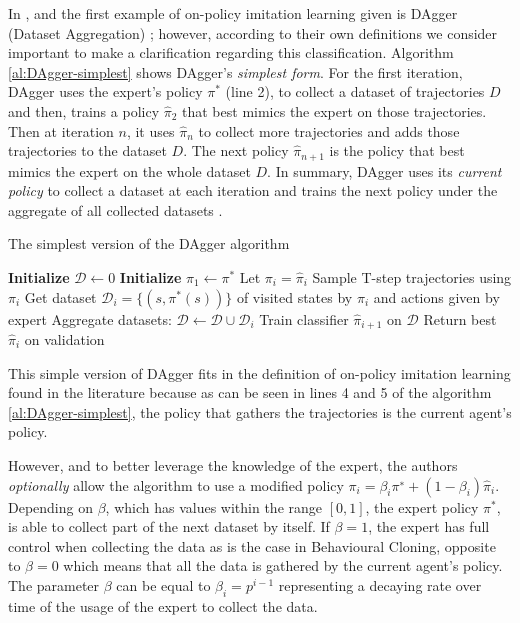In \cite{DBLP:journals/corr/LaskeyLHLMFG17}, \cite{OtherLaskeydefinitions:2019} and \cite{Osa:2018} the first example of on-policy imitation learning given is DAgger (Dataset  Aggregation) \cite{DAgger-Ross:2011}; however, according to their own definitions we consider important to make a clarification regarding this classification. Algorithm \ref{al:DAgger-simplest} shows DAgger's \textit{simplest form}. For the first iteration, DAgger uses the expert’s policy $\pi^*$ (line 2), to collect a dataset of trajectories $D$ and then, trains a policy  $\hat{\pi}_2$ that best mimics the expert on those trajectories. Then at iteration $n$, it uses $\hat{\pi}_n$ to collect more trajectories and adds those trajectories to the dataset $D$. The next policy $\hat{\pi}_{n+1}$ is the policy that best mimics the expert on the whole dataset $D$. In summary, DAgger uses its \textit{current policy} to collect a dataset at each iteration and trains the next policy under the aggregate of all collected datasets \cite{DAgger-Ross:2011}.

\begin{algorithm}[H]
\caption{The simplest version of the DAgger algorithm }
\begin{algorithmic}[1]
\State \textbf{Initialize} $\mathcal{D} \leftarrow 0$ 
\State \textbf{Initialize} $\hat{\pi}_1 \leftarrow \pi^*$ 
\State Let $\pi_i = \hat{\pi}_i$
\State Sample T-step trajectories using $\pi_i$
\State Get dataset  $\mathcal{D}_i = \{(s, \pi^*(s))\}$ of visited states by $\pi_i$ and actions given by expert
\State Aggregate datasets:  $\mathcal{D} \leftarrow \mathcal{D} \cup  \mathcal{D}_i$
\State  Train classifier $\hat{\pi}_{i+1}$ on $\mathcal{D}$
\EndFor
\State Return best $\hat{\pi}_i$ on validation
\end{algorithmic}
\label{al:DAgger-simplest}
\end{algorithm}

This simple version of DAgger fits in the definition of on-policy imitation learning found in the literature because as can be seen in lines 4 and 5 of the algorithm \ref{al:DAgger-simplest}, the policy that gathers the trajectories is the current agent's policy.


However, and to better leverage the knowledge of the expert, the authors \textit{optionally} allow the algorithm to use a modified policy $\pi_i=\beta_i\pi^{∗}+ (1−\beta_i)\hat{\pi}_i$. Depending on $\beta$,  which has values within the range $[0,1]$, the expert policy $\pi^*$, is able to collect part of the next dataset by itself. If $\beta = 1$, the expert has full control when collecting the data as is the case in Behavioural Cloning, opposite to $\beta=0$  which means that all the data is gathered by the current agent's policy. The parameter $\beta$ can be equal to $\beta_i=p^{i−1}$ representing a decaying rate over time of the usage of the expert to collect the data.


